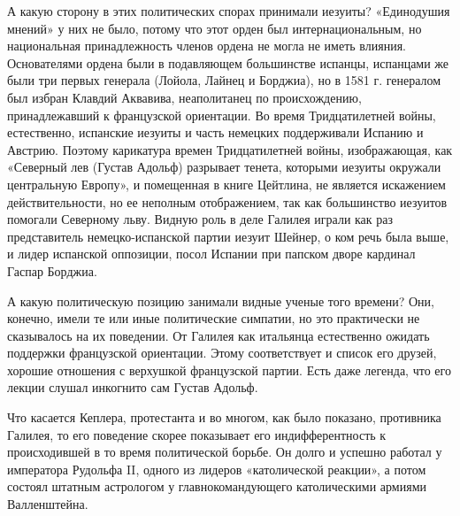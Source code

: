 А  какую  сторону  в   этих  политических  спорах  принимали  иезуиты?
«Единодушия  мнений»  у  них  не  было,  потому  что  этот  орден  был
интернациональным,  но национальная  принадлежность  членов ордена  не
могла  не  иметь  влияния.  Основателями  ордена  были  в  подавляющем
большинстве испанцы,  испанцами же  были три первых  генерала (Лойола,
Лайнец  и  Борджиа),  но  в  1581  г.  генералом  был  избран  Клавдий
Аквавива, неаполитанец по  происхождению, принадлежавший к французской
ориентации.  Во  время  Тридцатилетней войны,  естественно,  испанские
иезуиты  и  часть немецких  поддерживали  Испанию  и Австрию.  Поэтому
карикатура  времен Тридцатилетней  войны, изображающая,  как «Северный
лев  (Густав  Адольф)  разрывает  тенета,  которыми  иезуиты  окружали
центральную  Европу»,  и  помещенная  в книге  Цейтлина,  не  является
искажением  действительности, но  ее  неполным  отображением, так  как
большинство  иезуитов  помогали Северному  льву.  Видную  роль в  деле
Галилея играли  как раз представитель немецко-испанской  партии иезуит
Шейнер,  о ком  речь была  выше,  и лидер  испанской оппозиции,  посол
Испании при папском дворе кардинал Гаспар Борджиа.

А какую политическую позицию занимали видные ученые того времени? Они,
конечно, имели те  или иные политические симпатии,  но это практически
не сказывалось на  их поведении. От Галилея  как итальянца естественно
ожидать поддержки французской ориентации. Этому соответствует и список
его  друзей, хорошие  отношения с  верхушкой французской  партии. Есть
даже легенда, что его лекции слушал инкогнито сам Густав Адольф.

Что  касается Кеплера,  протестанта и  во многом,  как было  показано,
противника   Галилея,  то   его   поведение   скорее  показывает   его
индифферентность  к  происходившей  в то  время  политической  борьбе.
Он  долго  и успешно  работал  у  императора  Рудольфа II,  одного  из
лидеров «католической  реакции», а потом состоял  штатным астрологом у
главнокомандующего католическими армиями Валленштейна.

